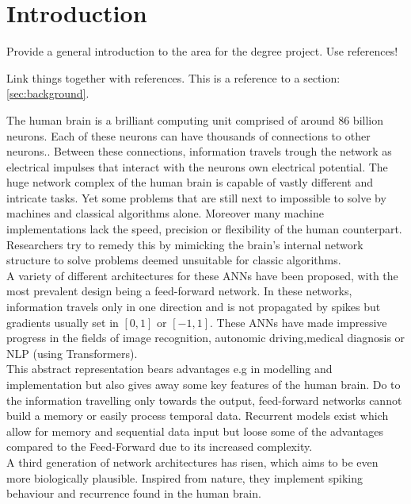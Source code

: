 \chapter{Introduction}

Provide a general introduction to the area for the degree project. Use references!

Link things together with references. This is a reference to a section: \ref{sec:background}.



The human brain is a brilliant computing unit comprised of around 86 billion\cite{azevedo_equal_2009} neurons. Each of these neurons can have thousands of connections to other neurons.. Between these connections, information travels trough the network as electrical impulses that interact with the neurons own electrical potential. The huge network complex of the human brain is capable of vastly different and intricate tasks. Yet some problems that are still next to impossible to solve by machines and classical algorithms alone. Moreover many machine implementations lack the speed, precision or flexibility of the human counterpart.\\
Researchers try to remedy this by mimicking the brain's internal network structure to solve problems deemed unsuitable for classic algorithms.\\
A variety of different architectures for these \acp{ANN} have been proposed, with the most prevalent design being a feed-forward network.
In these networks, information travels only in one direction and is not propagated by spikes but gradients usually set in $[0,1]$ or $[-1,1]$.
These \acp{ANN} have made impressive progress in the fields of image recognition, autonomic driving,medical diagnosis\cite{patel_applications_2007} or  \ac{NLP} (using Transformers\cite{vaswani_attention_2017}).\\
This abstract representation bears advantages e.g in modelling and implementation but also gives away some key features of the human brain. Do to the information travelling only towards the output, feed-forward networks cannot build a memory or easily process temporal data. Recurrent models exist which allow for memory  and sequential data input but loose some of the advantages compared to the Feed-Forward due to its increased complexity.\\
A third generation\cite{maass_networks_1997} of network architectures has risen, which aims to be even more biologically plausible. Inspired from nature, they implement spiking behaviour and recurrence found in the human brain.
